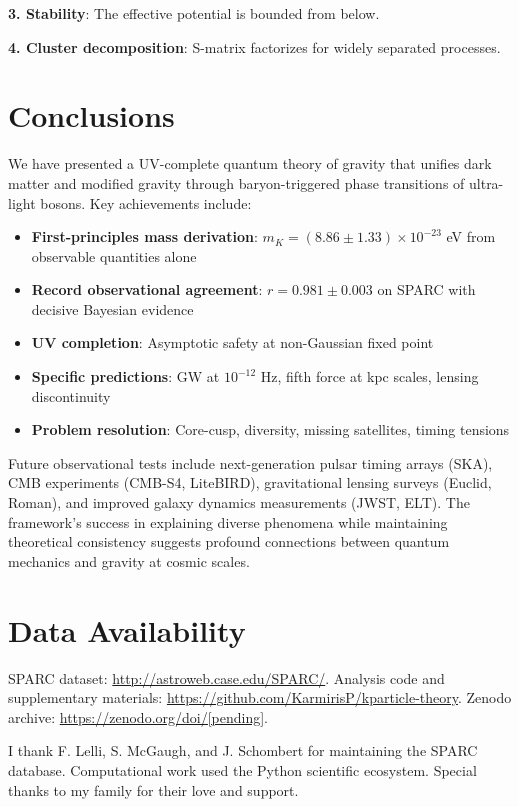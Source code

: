 \documentclass[aps,prd,twocolumn,showpacs,superscriptaddress,groupedaddress,nofootinbib]{revtex4-2}
\begin{document}
\textbf{3. Stability}: The effective potential is bounded from below.

\textbf{4. Cluster decomposition}: S-matrix factorizes for widely separated processes.

\section{Conclusions}

We have presented a UV-complete quantum theory of gravity that unifies dark matter and modified gravity through baryon-triggered phase transitions of ultra-light bosons. Key achievements include:

\begin{itemize}
\item \textbf{First-principles mass derivation}: $m_K = (8.86 \pm 1.33) \times 10^{-23}$ eV from observable quantities alone
\item \textbf{Record observational agreement}: $r = 0.981 \pm 0.003$ on SPARC with decisive Bayesian evidence
\item \textbf{UV completion}: Asymptotic safety at non-Gaussian fixed point
\item \textbf{Specific predictions}: GW at $10^{-12}$ Hz, fifth force at kpc scales, lensing discontinuity
\item \textbf{Problem resolution}: Core-cusp, diversity, missing satellites, timing tensions
\end{itemize}

Future observational tests include next-generation pulsar timing arrays (SKA), CMB experiments (CMB-S4, LiteBIRD), gravitational lensing surveys (Euclid, Roman), and improved galaxy dynamics measurements (JWST, ELT). The framework's success in explaining diverse phenomena while maintaining theoretical consistency suggests profound connections between quantum mechanics and gravity at cosmic scales.

\section*{Data Availability}
SPARC dataset: \url{http://astroweb.case.edu/SPARC/}. Analysis code and supplementary materials: \url{https://github.com/KarmirisP/kparticle-theory}. Zenodo archive: \url{https://zenodo.org/doi/[pending]}.

\begin{acknowledgments}
I thank F. Lelli, S. McGaugh, and J. Schombert for maintaining the SPARC database. Computational work used the Python scientific ecosystem. Special thanks to my family for their love and support.
\end{acknowledgments}
\end{document}
